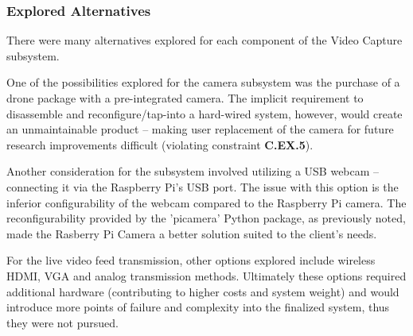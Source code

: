 \subsubsection{Explored Alternatives}
There were many alternatives explored for each component of the Video Capture subsystem.

One of the possibilities explored for the camera subsystem was the purchase of a drone package with a pre-integrated camera. The implicit requirement to disassemble and reconfigure/tap-into a hard-wired system, however, would create an unmaintainable product -- making user replacement of the camera for future research improvements difficult (violating constraint \textbf{C.EX.5}).

Another consideration for the subsystem involved utilizing a USB webcam -- connecting it via the Raspberry Pi's USB port. The issue with this option is the inferior configurability of the webcam compared to the Raspberry Pi camera. The reconfigurability provided by the 'picamera' Python package, as previously noted, made the Rasberry Pi Camera a better solution suited to the client's needs.

For the live video feed transmission, other options explored include wireless HDMI, VGA and analog transmission methods.  Ultimately these options required additional hardware (contributing to higher costs and system weight) and would introduce more points of failure and complexity into the finalized system, thus they were not pursued.
